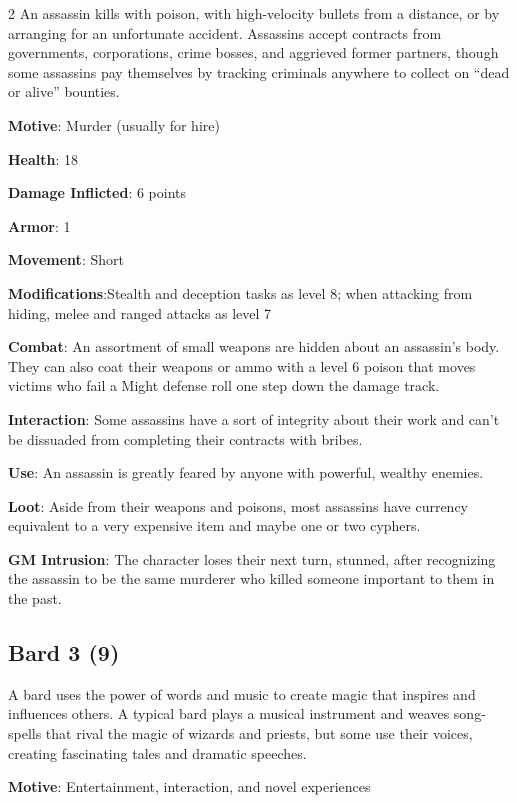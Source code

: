 \begin{multicols}{2}
An assassin kills with poison, with high-velocity bullets from a distance, or by arranging for an unfortunate accident. Assassins accept contracts from governments, corporations, crime bosses, and aggrieved former partners, though some assassins pay themselves by tracking criminals anywhere to collect on “dead or alive” bounties.

\textbf{Motive}: Murder (usually for hire)

\textbf{Health}: 18

\textbf{Damage Inflicted}: 6 points 

\textbf{Armor}: 1

\textbf{Movement}: Short

\textbf{Modifications}:Stealth and deception tasks as level 8; when attacking from hiding, melee and ranged attacks as level 7

\textbf{Combat}: An assortment of small weapons are hidden about an assassin’s body. They can also coat their weapons or ammo with a level 6 poison that moves victims who fail a Might defense roll one step down the damage track.

\textbf{Interaction}: Some assassins have a sort of integrity about their work and can’t be dissuaded from completing their contracts with bribes. 

\textbf{Use}: An assassin is greatly feared by anyone with powerful, wealthy enemies.

\textbf{Loot}: Aside from their weapons and poisons, most assassins have currency equivalent to a very expensive item and maybe one or two cyphers.

\textbf{GM Intrusion}: The character loses their next turn, stunned, after recognizing the assassin to be the same murderer who killed someone important to them in the past.

\subsection{Bard 3 (9)}

A bard uses the power of words and music to create magic that inspires and influences others. A typical bard plays a musical instrument and weaves song-spells that rival the magic of wizards and priests, but some use their voices, creating fascinating tales and dramatic speeches. 

\textbf{Motive}: Entertainment, interaction, and novel experiences 


\end{multicols}

